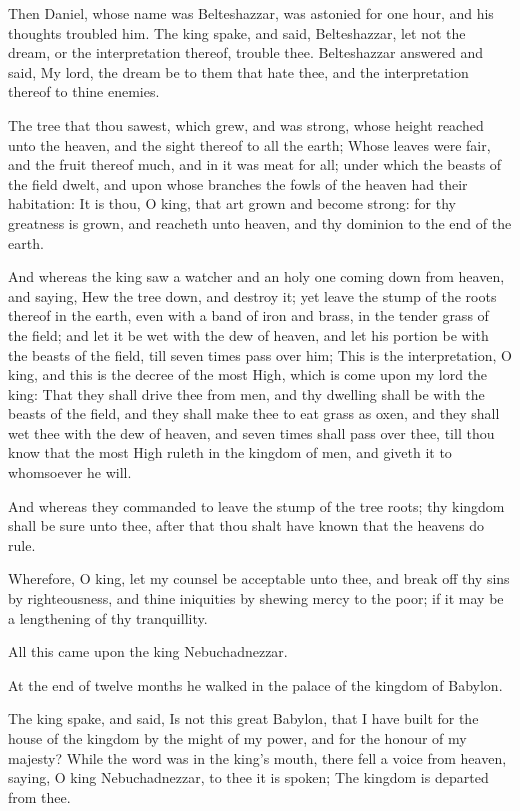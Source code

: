\Verse Then Daniel, whose name was Belteshazzar, was astonied for one hour, and his thoughts troubled him. The king spake, and said, Belteshazzar, let not the dream, or the interpretation thereof, trouble thee. Belteshazzar answered and said, My lord, the dream be to them that hate thee, and the interpretation thereof to thine enemies.

\Verse The tree that thou sawest, which grew, and was strong, whose height reached unto the heaven, and the sight thereof to all the earth; \Verse Whose leaves were fair, and the fruit thereof much, and in it was meat for all; under which the beasts of the field dwelt, and upon whose branches the fowls of the heaven had their habitation: \Verse It is thou, O king, that art grown and become strong: for thy greatness is grown, and reacheth unto heaven, and thy dominion to the end of the earth.

\Verse And whereas the king saw a watcher and an holy one coming down from heaven, and saying, Hew the tree down, and destroy it; yet leave the stump of the roots thereof in the earth, even with a band of iron and brass, in the tender grass of the field; and let it be wet with the dew of heaven, and let his portion be with the beasts of the field, till seven times pass over him; \Verse This is the interpretation, O king, and this is the decree of the most High, which is come upon my lord the king: \Verse That they shall drive thee from men, and thy dwelling shall be with the beasts of the field, and they shall make thee to eat grass as oxen, and they shall wet thee with the dew of heaven, and seven times shall pass over thee, till thou know that the most High ruleth in the kingdom of men, and giveth it to whomsoever he will.

\Verse And whereas they commanded to leave the stump of the tree roots; thy kingdom shall be sure unto thee, after that thou shalt have known that the heavens do rule.

\Verse Wherefore, O king, let my counsel be acceptable unto thee, and break off thy sins by righteousness, and thine iniquities by shewing mercy to the poor; if it may be a lengthening of thy tranquillity.

\Verse All this came upon the king Nebuchadnezzar.

\Verse At the end of twelve months he walked in the palace of the kingdom of Babylon.

\Verse The king spake, and said, Is not this great Babylon, that I have built for the house of the kingdom by the might of my power, and for the honour of my majesty?  \Verse While the word was in the king's mouth, there fell a voice from heaven, saying, O king Nebuchadnezzar, to thee it is spoken; The kingdom is departed from thee.

